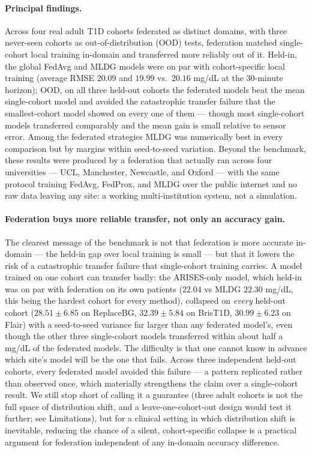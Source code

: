 \documentclass[10pt,letterpaper]{article}
\begin{document}
\paragraph{Principal findings.} Across four real adult T1D cohorts federated as
distinct domains, with three never-seen cohorts as out-of-distribution (OOD)
tests, federation matched single-cohort local training in-domain and transferred
more reliably out of it. Held-in, the global FedAvg and MLDG models were on par
with cohort-specific local training (average RMSE $20.09$ and $19.99$ vs.\
$20.16$ mg/dL at the 30-minute horizon); OOD, on all three held-out cohorts the
federated models beat the mean single-cohort model and avoided the catastrophic
transfer failure that the smallest-cohort model showed on every one of them ---
though most single-cohort models transferred comparably and the mean gain is
small relative to sensor error. Among the federated strategies MLDG was
numerically best in every comparison but by margins within seed-to-seed
variation. Beyond the benchmark, these results were produced by a federation that
actually ran across four universities --- UCL, Manchester, Newcastle, and Oxford
--- with the same protocol training FedAvg, FedProx, and MLDG over the public
internet and no raw data leaving any site: a working multi-institution system,
not a simulation.

\paragraph{Federation buys more reliable transfer, not only an accuracy gain.}
The clearest message of the benchmark is not that federation is more accurate
in-domain --- the held-in gap over local training is small --- but that it
lowers the risk of a catastrophic transfer failure that single-cohort training
carries. A model trained on one cohort can transfer badly: the ARISES-only
model, which held-in was on par with federation on its own patients ($22.04$ vs
MLDG $22.30$ mg/dL, this being the hardest cohort for every method), collapsed on
\emph{every} held-out cohort ($28.51 \pm 6.85$ on ReplaceBG, $32.39 \pm 5.84$ on
BrisT1D, $30.99 \pm 6.23$ on Flair) with a seed-to-seed variance far larger than
any federated model's, even though the other three single-cohort models
transferred within about half a mg/dL of the federated models. The difficulty is
that one cannot know in advance which site's model will be the one that fails.
Across three independent held-out cohorts, every federated model avoided this
failure --- a pattern replicated rather than observed once, which materially
strengthens the claim over a single-cohort result. We still stop short of calling
it a guarantee (three adult cohorts is not the full space of distribution shift,
and a leave-one-cohort-out design would test it further; see Limitations), but
for a clinical setting in which distribution shift is inevitable, reducing the
chance of a silent, cohort-specific collapse is a practical argument for
federation independent of any in-domain accuracy difference.
\end{document}
